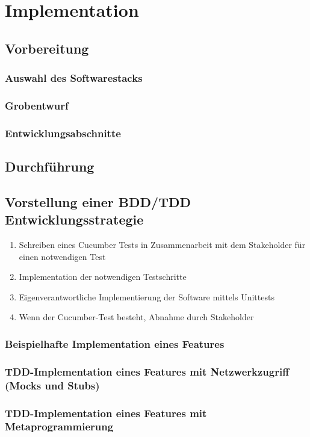 \section{Implementation}
\subsection{Vorbereitung}
\subsubsection{Auswahl des Softwarestacks}
\subsubsection{Grobentwurf}
\subsubsection{Entwicklungsabschnitte}
\subsection{Durchführung}
\subsection{Vorstellung einer BDD/TDD Entwicklungsstrategie}
  \begin{enumerate}
    \item Schreiben eines Cucumber Tests in Zusammenarbeit mit dem Stakeholder für einen notwendigen Test
    \item Implementation der notwendigen Testschritte
    \item Eigenverantwortliche Implementierung der Software mittels Unittests
    \item Wenn der Cucumber-Test besteht, Abnahme durch Stakeholder
  \end{enumerate}


\subsubsection{Beispielhafte Implementation eines Features}
\subsubsection{TDD-Implementation eines Features mit Netzwerkzugriff (Mocks und Stubs)}
\subsubsection{TDD-Implementation eines Features mit Metaprogrammierung}